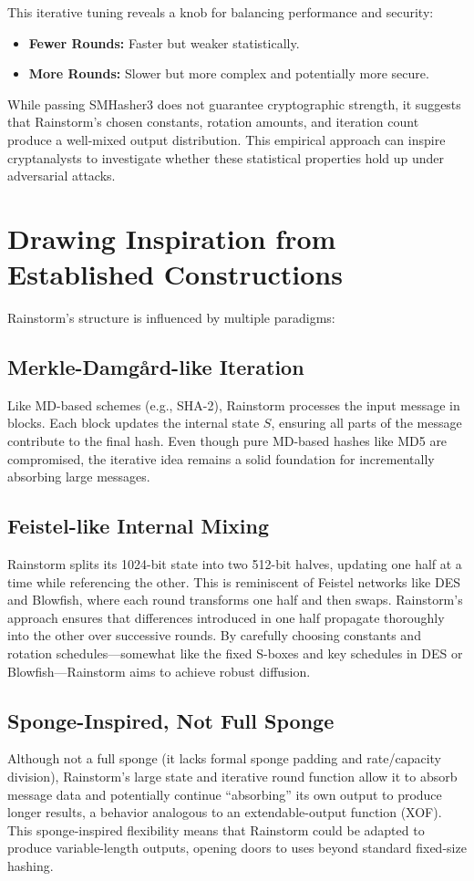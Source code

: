 \documentclass[11pt,a4paper]{article}
\begin{document}
This iterative tuning reveals a knob for balancing performance and security:  
\begin{itemize}
  \item \textbf{Fewer Rounds:} Faster but weaker statistically.  
  \item \textbf{More Rounds:} Slower but more complex and potentially more secure.
\end{itemize}

While passing SMHasher3 does not guarantee cryptographic strength, it suggests that Rainstorm’s chosen constants, rotation amounts, and iteration count produce a well-mixed output distribution. This empirical approach can inspire cryptanalysts to investigate whether these statistical properties hold up under adversarial attacks.

\section*{Drawing Inspiration from Established Constructions}
Rainstorm’s structure is influenced by multiple paradigms:

\subsection*{Merkle-Damg{\aa}rd-like Iteration}
Like MD-based schemes (e.g., SHA-2), Rainstorm processes the input message in blocks. Each block updates the internal state \(S\), ensuring all parts of the message contribute to the final hash. Even though pure MD-based hashes like MD5 are compromised, the iterative idea remains a solid foundation for incrementally absorbing large messages.

\subsection*{Feistel-like Internal Mixing}
Rainstorm splits its 1024-bit state into two 512-bit halves, updating one half at a time while referencing the other. This is reminiscent of Feistel networks like DES and Blowfish, where each round transforms one half and then swaps. Rainstorm’s approach ensures that differences introduced in one half propagate thoroughly into the other over successive rounds. By carefully choosing constants and rotation schedules—somewhat like the fixed S-boxes and key schedules in DES or Blowfish—Rainstorm aims to achieve robust diffusion.

\subsection*{Sponge-Inspired, Not Full Sponge}
Although not a full sponge (it lacks formal sponge padding and rate/capacity division), Rainstorm’s large state and iterative round function allow it to absorb message data and potentially continue “absorbing” its own output to produce longer results, a behavior analogous to an extendable-output function (XOF). This sponge-inspired flexibility means that Rainstorm could be adapted to produce variable-length outputs, opening doors to uses beyond standard fixed-size hashing.
\end{document}
